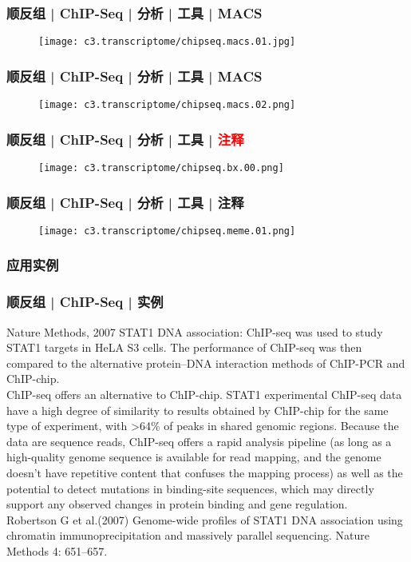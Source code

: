 \begin{frame}
  \frametitle{顺反组 | ChIP-Seq | 分析 | 工具 | MACS}
  \begin{figure}
    \centering
    \texttt{[image: c3.transcriptome/chipseq.macs.01.jpg]}
  \end{figure}
\end{frame}

\begin{frame}
  \frametitle{顺反组 | ChIP-Seq | 分析 | 工具 | MACS}
  \begin{figure}
    \centering
    \texttt{[image: c3.transcriptome/chipseq.macs.02.png]}
  \end{figure}
\end{frame}

\begin{frame}
  \frametitle{顺反组 | ChIP-Seq | 分析 | 工具 | \textcolor{red}{注释}}
  \begin{figure}
    \centering
    \texttt{[image: c3.transcriptome/chipseq.bx.00.png]}
  \end{figure}
\end{frame}

\begin{frame}
  \frametitle{顺反组 | ChIP-Seq | 分析 | 工具 | 注释}
  \begin{figure}
    \centering
    \texttt{[image: c3.transcriptome/chipseq.meme.01.png]}
  \end{figure}
\end{frame}

\subsubsection{应用实例}
\begin{frame}
  \frametitle{顺反组 | ChIP-Seq | 实例}
  {\footnotesize
    \begin{block}{Nature Methods, 2007}
  STAT1 DNA association: ChIP-seq was used to study STAT1 targets in HeLA S3 cells. The performance of ChIP-seq was then compared to the alternative protein–DNA interaction methods of ChIP-PCR and ChIP-chip.\\
  \vspace{0.5em}
  ChIP-seq offers an alternative to ChIP-chip. STAT1 experimental ChIP-seq data have a high degree of similarity to results obtained by ChIP-chip for the same type of experiment, with >64\% of peaks in shared genomic regions. Because the data are sequence reads, ChIP-seq offers a rapid analysis pipeline (as long as a high-quality genome sequence is available for read mapping, and the genome doesn't have repetitive content that confuses the mapping process) as well as the potential to detect mutations in binding-site sequences, which may directly support any observed changes in protein binding and gene regulation.\\
  \vspace{0.5em}
  Robertson G et al.(2007) Genome-wide profiles of STAT1 DNA association using chromatin immunoprecipitation and massively parallel sequencing. Nature Methods 4: 651–657.
    \end{block}
}
\end{frame}

